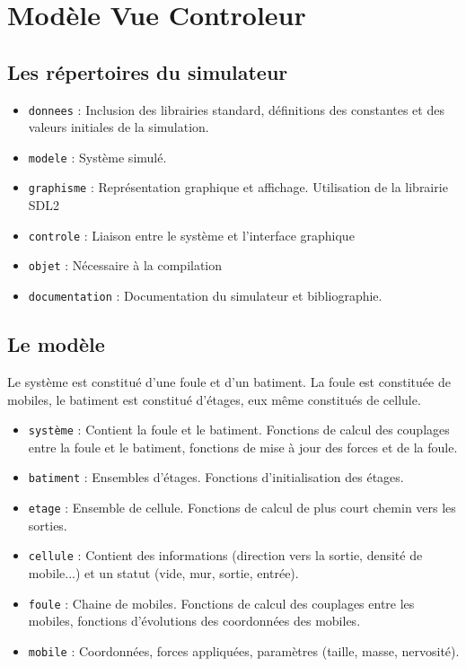 %
\section{Modèle Vue Controleur}
%
%
\subsection{Les répertoires du simulateur}
\begin{itemize}[leftmargin=2cm]
\item \texttt{donnees} : Inclusion des librairies standard, définitions des constantes et des valeurs initiales de la simulation.
\item \texttt{modele} : Système simulé. 
\item \texttt{graphisme} : Représentation graphique et affichage. Utilisation de la librairie SDL2
\item \texttt{controle} : Liaison entre le système et l'interface graphique 
\item \texttt{objet} : Nécessaire à la compilation
\item \texttt{documentation} : Documentation du simulateur et bibliographie.
\end{itemize}
%
\subsection{Le modèle}
Le système est constitué d'une foule et d'un batiment. La foule est constituée de mobiles, le batiment est constitué d'étages, eux même constitués de cellule.
\begin{itemize}[leftmargin=2cm]
\item \texttt{système} : Contient la foule et le batiment. Fonctions de calcul des couplages entre la foule et le batiment, fonctions de mise à jour des forces et de la foule.
\item \texttt{batiment} : Ensembles d'étages. Fonctions d'initialisation des étages.
\item \texttt{etage} : Ensemble de cellule. Fonctions de calcul de plus court chemin vers les sorties.
\item \texttt{cellule} : Contient des informations (direction vers la sortie, densité de mobile...) et un statut (vide, mur, sortie, entrée).
\item \texttt{foule} : Chaine de mobiles. Fonctions de calcul des couplages entre les mobiles, fonctions d'évolutions des coordonnées des mobiles.
\item \texttt{mobile} : Coordonnées, forces appliquées, paramètres (taille, masse, nervosité).
\end{itemize}
%
